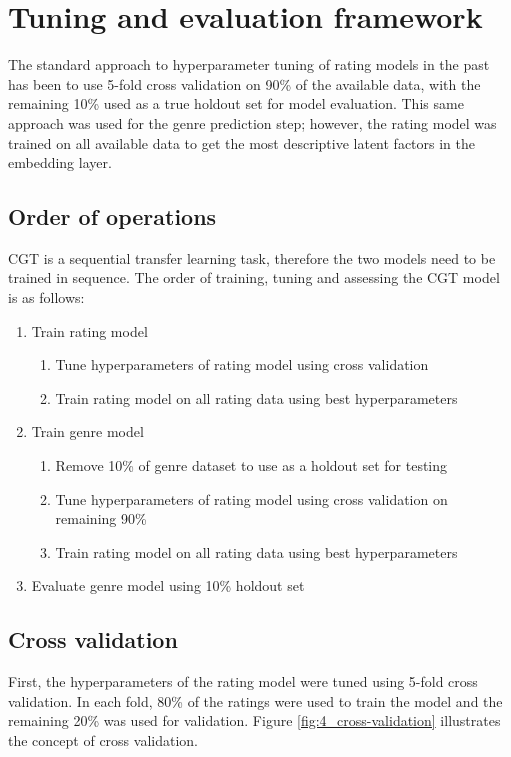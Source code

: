 \section{Tuning and evaluation framework}
The standard approach to hyperparameter tuning of rating models in the past has been to use 5-fold cross validation on 90\% of the available data, with the remaining 10\% used as a true holdout set for model evaluation. This same approach was used for the genre prediction step; however, the rating model was trained on all available data to get the most descriptive latent factors in the embedding layer.

\subsection{Order of operations}
CGT is a sequential transfer learning task, therefore the two models need to be trained in sequence. The order of training, tuning and assessing the CGT model is as follows:

\begin{enumerate}
  \item Train rating model
  \begin{enumerate}
    \item Tune hyperparameters of rating model using cross validation
    \item Train rating model on all rating data using best hyperparameters
  \end{enumerate}
  \item Train genre model
  \begin{enumerate}
    \item Remove 10\% of genre dataset to use as a holdout set for testing
    \item Tune hyperparameters of rating model using cross validation on remaining 90\%
    \item Train rating model on all rating data using best hyperparameters
  \end{enumerate}
  \item Evaluate genre model using 10\% holdout set
\end{enumerate}

\subsection{Cross validation}
First, the hyperparameters of the rating model were tuned using 5-fold cross validation. In each fold, 80\% of the ratings were used to train the model and the remaining 20\% was used for validation. Figure \ref{fig:4_cross-validation} illustrates the concept of cross validation.

